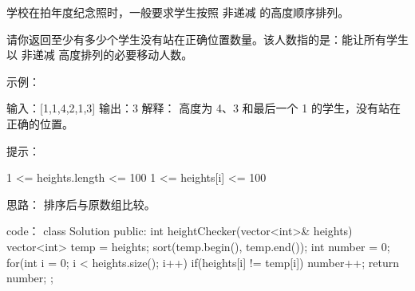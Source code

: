 学校在拍年度纪念照时，一般要求学生按照 非递减 的高度顺序排列。

请你返回至少有多少个学生没有站在正确位置数量。该人数指的是：能让所有学生以 非递减 高度排列的必要移动人数。

 

示例：

输入：[1,1,4,2,1,3]
输出：3
解释：
高度为 4、3 和最后一个 1 的学生，没有站在正确的位置。

 

提示：

    1 <= heights.length <= 100
    1 <= heights[i] <= 100




















思路：
排序后与原数组比较。




















code：
class Solution {
public:
    int heightChecker(vector<int>& heights) {
        vector<int> temp = heights;
        sort(temp.begin(), temp.end());
        int number = 0;
        for(int i = 0; i < heights.size(); i++)
        {
            if(heights[i] != temp[i]) number++;
        }
        return number;
    }
};